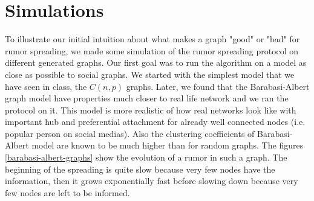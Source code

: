 \documentclass[10pt,journal,a4paper]{IEEEtran}
\begin{document}
\section{Simulations}

To illustrate our initial intuition about what makes a graph "good" or "bad" for rumor spreading, we made some simulation of the rumor spreading protocol on different generated graphs. Our first goal was to run the algorithm on a model as close as possible to social graphs. We started with the simplest model that we have seen in class, the $C(n,p)$ graphs. Later, we found that the Barabasi-Albert graph model \cite{abmodel} have properties much closer to real life network and we ran the protocol on it. This model is more realistic of how real networks look like with important hub and preferential attachment for already well connected nodes (i.e. popular person on social medias). Also the clustering coefficients of Barabasi-Albert model are known to be much higher than for random graphs. The figures \ref{barabasi-albert-graphs} show the evolution of a rumor in such a graph. The beginning of the spreading is quite slow because very few nodes have the information, then it grows exponentially fast before slowing down because very few nodes are left to be informed. 
\end{document}

